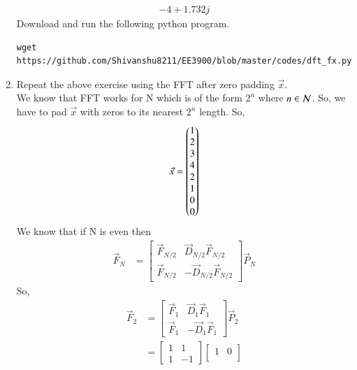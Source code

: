 \documentclass[journal,12pt,twocolumn]{IEEEtran}
\renewcommand\thesection{\arabic{section}}
\begin{document}
\begin{enumerate}[label=\arabic*.,ref=\thesection.\theenumi]
\begin{align}
{                     -4+1.732j}
           \end{align}
           Download and run the following python program.
           \begin{lstlisting}
wget https://github.com/Shivanshu8211/EE3900/blob/master/codes/dft_fx.py
           \end{lstlisting}
     \item Repeat the above exercise using the FFT
           after zero padding $\vec{x}$. \\
           \solution  We know that FFT works for N  which is of the form $2^n$ where $n\in \cal N$.
           So, we have to pad $\vec{x}$ with zeros to its nearest $2^n$ length.
           So,
           \begin{align}
                \vec{x}=\begin{pmatrix}1 \\2\\3\\4\\2\\1\\0\\0\end{pmatrix}
           \end{align}
           We know that if N is even then
           \begin{align}
                \vec{F}_N & =\begin{bmatrix}
                                  \vec{F}_{N/2} & \vec{D}_{N/2}\vec{F}_{N/2}  \\
                                  \vec{F}_{N/2} & -\vec{D}_{N/2}\vec{F}_{N/2}
                             \end{bmatrix}\vec{P}_N
           \end{align}
           So,
           \begin{align}
                \vec{F}_2 & =\begin{bmatrix}
                                  \vec{F}_{1} & \vec{D}_{1}\vec{F}_{1}  \\
                                  \vec{F}_{1} & -\vec{D}_{1}\vec{F}_{1}
                             \end{bmatrix}\vec{P}_2 \\
                          & =\begin{bmatrix}
                                  1 & 1  \\
                                  1 & -1
                             \end{bmatrix}
                \begin{bmatrix}
                     1 & 0 \\

\end{bmatrix}
\end{align}
\end{enumerate}
\end{document}
